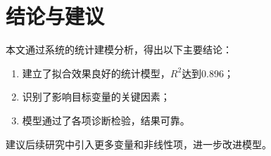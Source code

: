 \section{结论与建议}


本文通过系统的统计建模分析，得出以下主要结论：
\begin{enumerate}
    \item 建立了拟合效果良好的统计模型，$R^2$达到0.896；
    \item 识别了影响目标变量的关键因素；
    \item 模型通过了各项诊断检验，结果可靠。
\end{enumerate}

建议后续研究中引入更多变量和非线性项，进一步改进模型。
